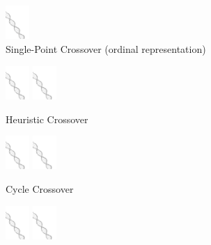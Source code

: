 \begin{figure}
\begin{subfigure}[b]{0.3\textwidth}
		\includegraphics[width=0.1\textwidth]{res/cover.png}
		\caption{Single-Point Crossover (ordinal representation)}
		\label{fig:z}
    	\end{subfigure}
%
	\begin{subfigure}[b]{0.3\textwidth}
		\centering
		\includegraphics[width=0.1\textwidth]{res/cover.png}
		\includegraphics[width=0.1\textwidth]{res/cover.png}
		\caption{Heuristic Crossover}
		\label{fig:x}
    	\end{subfigure}
%
	\begin{subfigure}[b]{0.3\textwidth}
		\centering
		\includegraphics[width=0.1\textwidth]{res/cover.png}
		\includegraphics[width=0.1\textwidth]{res/cover.png}
		\caption{Cycle Crossover}
		\label{fig:y}
    	\end{subfigure}
%
	\begin{subfigure}[b]{0.3\textwidth}
		\centering
		\includegraphics[width=0.1\textwidth]{res/cover.png}
		\includegraphics[width=0.1\textwidth]{res/cover.png}

\end{subfigure}
\end{figure}

